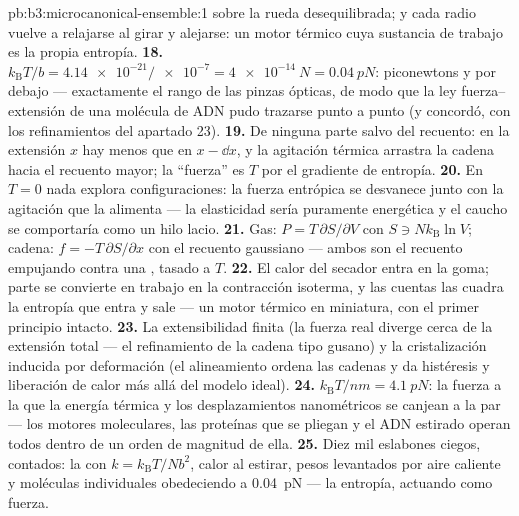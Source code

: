 \begin{solution}{pb:b3:microcanonical-ensemble:1}
sobre la rueda desequilibrada; y cada radio vuelve a relajarse al girar y
alejarse: un motor térmico cuya sustancia de trabajo es la propia entropía.
\textbf{18.} $k_{\text{B}}T/b = \num{4.14e-21}/\num{e-7} =
\qty{4e-14}{N} = \qty{0.04}{pN}$: piconewtons y por debajo ---
exactamente el rango de las pinzas ópticas, de modo que la ley
fuerza--extensión de una molécula de ADN pudo trazarse punto a punto (y
concordó, con los refinamientos del apartado 23).
\textbf{19.} De ninguna parte salvo del recuento: en la extensión $x$ hay
menos  que en $x - \dd x$, y la agitación térmica
arrastra la cadena hacia el recuento mayor; la ``fuerza'' es
$T$ por el gradiente de entropía.
\textbf{20.} En $T = 0$ nada explora configuraciones: la fuerza entrópica
se desvanece junto con la agitación que la alimenta ---
la elasticidad sería puramente energética y el caucho se comportaría
como un hilo lacio.
\textbf{21.} Gas: $P = T\,\partial S/\partial V$ con $S \ni
Nk_{\text{B}}\ln V$; cadena: $f = -T\,\partial S/\partial x$ con
el recuento gaussiano --- ambos son el recuento empujando contra una
, tasado a $T$.
\textbf{22.} El calor del secador entra en la goma; parte se convierte
en trabajo en la contracción isoterma, y las cuentas las cuadra la
entropía que entra y sale --- un motor térmico en miniatura, con el primer
principio intacto.
\textbf{23.} La extensibilidad finita (la fuerza real diverge cerca de la
extensión total --- el refinamiento de la cadena tipo gusano) y la
cristalización inducida por deformación (el alineamiento ordena las
cadenas y da histéresis y liberación de calor más allá del modelo ideal).
\textbf{24.} $k_{\text{B}}T/\unit{nm} = \qty{4.1}{pN}$: la
fuerza a la que la energía térmica y los desplazamientos nanométricos se
canjean a la par --- los motores moleculares, las proteínas que se pliegan
y el ADN estirado operan todos dentro de un orden de magnitud de ella.
\textbf{25.} Diez mil eslabones ciegos, contados: la  con
$k = k_{\text{B}}T/Nb^2$, calor al estirar, pesos levantados por
aire caliente y moléculas individuales obedeciendo a \qty{0.04}{pN} ---
la entropía, actuando como fuerza.
\end{solution}
